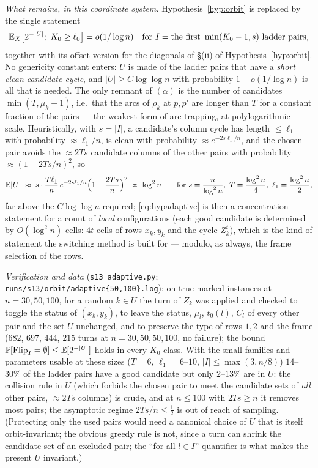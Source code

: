 \emph{What remains, in this coordinate system.}  Hypothesis~\ref{hyp:orbit}
is replaced by the single statement
\begin{equation}\label{eq:hypadaptive}
\mathbb{E}_X\bigl[2^{-|U|};\ K_0\ge\ell_0\bigr]=o(1/\log n)
\quad\text{for }I=\text{the first }\min(K_0-1,s)\text{ ladder pairs},
\end{equation}
together with its offset version for the diagonals of \S(ii) of
Hypothesis~\ref{hyp:orbit}.  No genericity constant enters: $U$ is
made of the ladder pairs that have a \emph{short clean candidate
cycle}, and $|U|\ge C\log\log n$ with probability $1-o(1/\log n)$ is
all that is needed.  The only remnant of $(\alpha)$ is the number of
candidates $\min(T,\mu_k-1)$, i.e.\ that the arcs of $\rho_k$ at $p,p'$
are longer than $T$ for a constant fraction of the pairs --- the
weakest form of arc trapping, at polylogarithmic scale.  Heuristically,
with $s=|I|$, a candidate's column cycle has length $\le\ell_1$ with
probability $\approx\ell_1/n$, is clean with probability
$\approx e^{-2s\ell_1/n}$, and the chosen pair avoids the
$\approx2Ts$ candidate columns of the other pairs with probability
$\approx(1-2Ts/n)^2$, so
\[
\E|U|\;\approx\;s\cdot\frac{T\ell_1}{n}\,e^{-2s\ell_1/n}\Bigl(1-\frac{2Ts}n\Bigr)^2
\;\asymp\;\log^2n\qquad\text{for }s=\frac n{\log^2n},\ T=\frac{\log^2n}4,\ \ell_1=\frac{\log^2n}2,
\]
far above the $C\log\log n$ required; \eqref{eq:hypadaptive} is then a
concentration statement for a count of \emph{local} configurations
(each good candidate is determined by $O(\log^2n)$ cells: $4t$ cells of
rows $x_k,y_k$ and the cycle $Z_k^t$), which is the kind of statement
the switching method is built for --- modulo, as always, the frame
selection of the rows.

\emph{Verification and data} (\texttt{s13\_adaptive.py};
\texttt{runs/s13/orbit/adaptive\{50,100\}.log}): on true-marked
instances at $n=30,50,100$, for a random $k\in U$ the turn of $Z_k$ was
applied and checked to toggle the status of $(x_k,y_k)$, to leave the
status, $\mu_l$, $t_0(l)$, $C_l$ of every other pair and the set $U$
unchanged, and to preserve the type of rows $1,2$ and the frame
($682$, $697$, $444$, $215$ turns at $n=30,50,50,100$, no failure);
the bound $\mathbb{P}[\mathrm{Flip}_I=\emptyset]\le\mathbb{E}[2^{-|U|}]$ holds in
every $K_0$ class.  With the small families and parameters usable at
these sizes ($T=6$, $\ell_1=6$--$10$, $|I|\le\max(3,n/8)$)
$14$--$30\%$ of the ladder pairs have a good candidate but only
$2$--$13\%$ are in $U$: the collision rule in $U$ (which forbids the
chosen pair to meet the candidate sets of \emph{all} other pairs,
$\approx2Ts$ columns) is crude, and at $n\le100$ with $2Ts\ge n$ it
removes most pairs; the asymptotic regime $2Ts/n\le\tfrac12$ is out of
reach of sampling.  (Protecting only the used pairs would need a
canonical choice of $U$ that is itself orbit-invariant; the obvious
greedy rule is not, since a turn can shrink the candidate set of an
excluded pair; the ``for all $l\in I$'' quantifier is what makes the
present $U$ invariant.)

